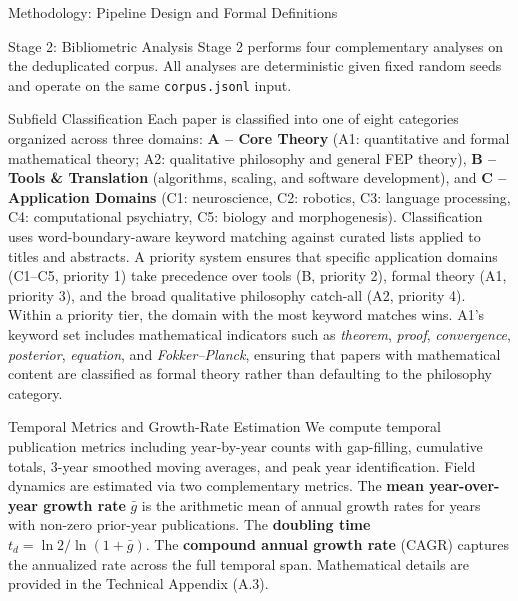 \documentclass[
  ignorenonframetext,
]{beamer}
\begin{document}
\begin{frame}[fragile]{Methodology: Pipeline Design and Formal
Definitions}
\begin{block}{Stage 2: Bibliometric Analysis}
\protect{}\label{stage-2-bibliometric-analysis}
Stage 2 performs four complementary analyses on the deduplicated corpus.
All analyses are deterministic given fixed random seeds and operate on
the same \texttt{corpus.jsonl} input.

\begin{block}{Subfield Classification}
\protect{}\label{subfield-classification}
Each paper is classified into one of eight categories organized across
three domains: \textbf{A -- Core Theory} (A1: quantitative and formal
mathematical theory; A2: qualitative philosophy and general FEP theory),
\textbf{B -- Tools \& Translation} (algorithms, scaling, and software
development), and \textbf{C -- Application Domains} (C1: neuroscience,
C2: robotics, C3: language processing, C4: computational psychiatry, C5:
biology and morphogenesis). Classification uses word-boundary-aware
keyword matching against curated lists applied to titles and abstracts.
A priority system ensures that specific application domains (C1--C5,
priority 1) take precedence over tools (B, priority 2), formal theory
(A1, priority 3), and the broad qualitative philosophy catch-all (A2,
priority 4). Within a priority tier, the domain with the most keyword
matches wins. A1's keyword set includes mathematical indicators such as
\emph{theorem}, \emph{proof}, \emph{convergence}, \emph{posterior},
\emph{equation}, and \emph{Fokker--Planck}, ensuring that papers with
mathematical content are classified as formal theory rather than
defaulting to the philosophy category.
\end{block}

\begin{block}{Temporal Metrics and Growth-Rate Estimation}
\protect{}\label{temporal-metrics-and-growth-rate-estimation}
We compute temporal publication metrics including year-by-year counts
with gap-filling, cumulative totals, 3-year smoothed moving averages,
and peak year identification. Field dynamics are estimated via two
complementary metrics. The \textbf{mean year-over-year growth rate}
\(\bar{g}\) is the arithmetic mean of annual growth rates for years with
non-zero prior-year publications. The \textbf{doubling time}
\(t_d = \ln 2 / \ln(1 + \bar{g})\). The \textbf{compound annual growth
rate} (CAGR) captures the annualized rate across the full temporal span.
Mathematical details are provided in the Technical Appendix (A.3).
\end{block}


\end{block}
\end{frame}
\end{document}
